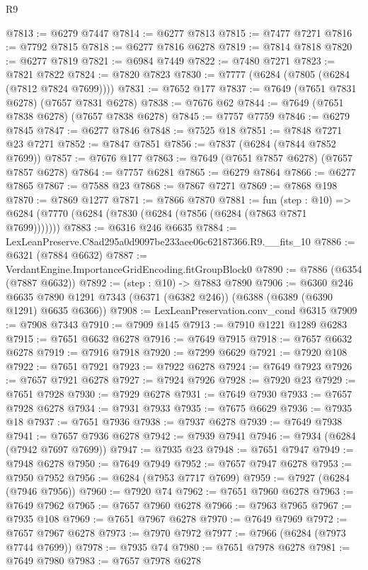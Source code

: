 \begin{lexlean}{R9}
\begin{coremodule}
@7813 := @6279 @7447
@7814 := @6277 @7813
@7815 := @7477 @7271
@7816 := @7792 @7815
@7818 := @6277 @7816 @6278
@7819 := @7814 @7818
@7820 := @6277 @7819
@7821 := @6984 @7449
@7822 := @7480 @7271
@7823 := @7821 @7822
@7824 := @7820 @7823
@7830 := @7777 (@6284 (@7805 (@6284 (@7812 @7824 @7699))))
@7831 := @7652 @177
@7837 := @7649 (@7651 @7831 @6278) (@7657 @7831 @6278)
@7838 := @7676 @62
@7844 := @7649 (@7651 @7838 @6278) (@7657 @7838 @6278)
@7845 := @7757 @7759
@7846 := @6279 @7845
@7847 := @6277 @7846
@7848 := @7525 @18
@7851 := @7848 @7271 @23 @7271
@7852 := @7847 @7851
@7856 := @7837 (@6284 (@7844 @7852 @7699))
@7857 := @7676 @177
@7863 := @7649 (@7651 @7857 @6278) (@7657 @7857 @6278)
@7864 := @7757 @6281
@7865 := @6279 @7864
@7866 := @6277 @7865
@7867 := @7588 @23
@7868 := @7867 @7271
@7869 := @7868 @198
@7870 := @7869 @1277
@7871 := @7866 @7870
@7881 := fun (step : @10) =>
  @6284 (@7770 (@6284 (@7830 (@6284 (@7856 (@6284 (@7863 @7871 @7699)))))))
@7883 := @6316 @246 @6635
@7884 := LexLeanPreserve.C8ad295a0d9097be233aee06c62187366.R9.__fits_10
@7886 := @6321 (@7884 @6632)
@7887 := VerdantEngine.ImportanceGridEncoding.fitGroupBlock0
@7890 := @7886 (@6354 (@7887 @6632))
@7892 := (step : @10) -> @7883 @7890
@7906 := @6360
    @246
    @6635
    @7890
    @1291
    @7343
    (@6371 (@6382 @246))
    (@6388 (@6389 (@6390 @1291) @6635 @6366))
@7908 := LexLeanPreservation.conv_cond @6315
@7909 := @7908 @7343
@7910 := @7909 @145
@7913 := @7910 @1221 @1289 @6283
@7915 := @7651 @6632 @6278
@7916 := @7649 @7915
@7918 := @7657 @6632 @6278
@7919 := @7916 @7918
@7920 := @7299 @6629
@7921 := @7920 @108
@7922 := @7651 @7921
@7923 := @7922 @6278
@7924 := @7649 @7923
@7926 := @7657 @7921 @6278
@7927 := @7924 @7926
@7928 := @7920 @23
@7929 := @7651 @7928
@7930 := @7929 @6278
@7931 := @7649 @7930
@7933 := @7657 @7928 @6278
@7934 := @7931 @7933
@7935 := @7675 @6629
@7936 := @7935 @18
@7937 := @7651 @7936
@7938 := @7937 @6278
@7939 := @7649 @7938
@7941 := @7657 @7936 @6278
@7942 := @7939 @7941
@7946 := @7934 (@6284 (@7942 @7697 @7699))
@7947 := @7935 @23
@7948 := @7651 @7947
@7949 := @7948 @6278
@7950 := @7649 @7949
@7952 := @7657 @7947 @6278
@7953 := @7950 @7952
@7956 := @6284 (@7953 @7717 @7699)
@7959 := @7927 (@6284 (@7946 @7956))
@7960 := @7920 @74
@7962 := @7651 @7960 @6278
@7963 := @7649 @7962
@7965 := @7657 @7960 @6278
@7966 := @7963 @7965
@7967 := @7935 @108
@7969 := @7651 @7967 @6278
@7970 := @7649 @7969
@7972 := @7657 @7967 @6278
@7973 := @7970 @7972
@7977 := @7966 (@6284 (@7973 @7744 @7699))
@7978 := @7935 @74
@7980 := @7651 @7978 @6278
@7981 := @7649 @7980
@7983 := @7657 @7978 @6278

\end{coremodule}
\end{lexlean}
